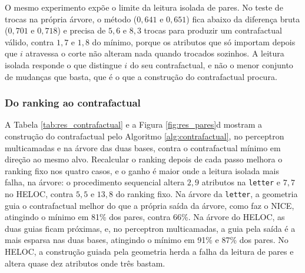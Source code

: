 O mesmo experimento expõe o limite da leitura isolada de pares. No teste de trocas na própria árvore, o método ($0{,}641$ e $0{,}651$) fica abaixo da diferença bruta ($0{,}701$ e $0{,}718$) e precisa de $5{,}6$ e $8{,}3$ trocas para produzir um contrafactual válido, contra $1{,}7$ e $1{,}8$ do mínimo, porque os atributos que só importam depois que $i$ atravessa o corte não alteram nada quando trocados sozinhos. A leitura isolada responde o que distingue $i$ do seu contrafactual, e não o menor conjunto de mudanças que basta, que é o que a construção do contrafactual procura.

\subsubsection*{Do ranking ao contrafactual}

A Tabela \ref{tab:res_contrafactual} e a Figura \ref{fig:res_pares}d mostram a construção do contrafactual pelo Algoritmo \ref{alg:contrafactual}, no perceptron multicamadas e na árvore das duas bases, contra o contrafactual mínimo em direção ao mesmo alvo. Recalcular o ranking depois de cada passo melhora o ranking fixo nos quatro casos, e o ganho é maior onde a leitura isolada mais falha, na árvore: o procedimento sequencial altera $2{,}9$ atributos na \texttt{letter} e $7{,}7$ no HELOC, contra $5{,}5$ e $13{,}8$ do ranking fixo. Na árvore da \texttt{letter}, a geometria guia o contrafactual melhor do que a própria saída da árvore, como faz o NICE, atingindo o mínimo em 81\% dos pares, contra 66\%. Na árvore do HELOC, as duas guias ficam próximas, e, no perceptron multicamadas, a guia pela saída é a mais esparsa nas duas bases, atingindo o mínimo em 91\% e 87\% dos pares. No HELOC, a construção guiada pela geometria herda a falha da leitura de pares e altera quase dez atributos onde três bastam.

